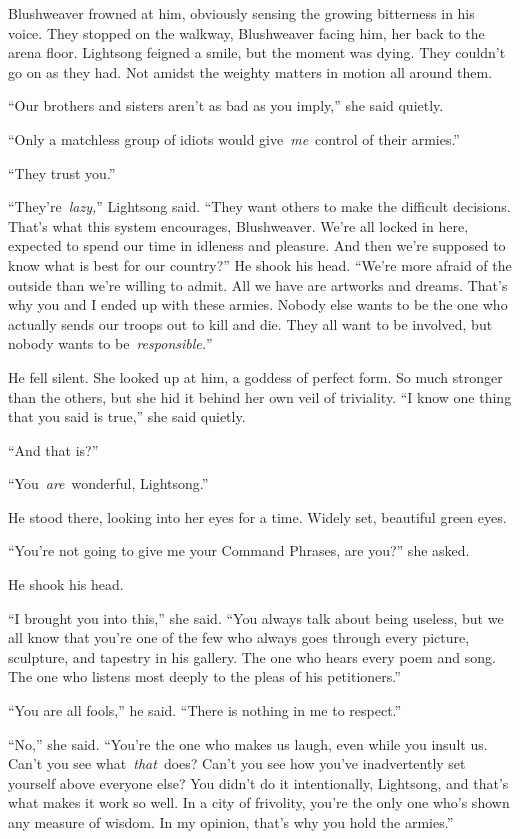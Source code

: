 Blushweaver frowned at him, obviously sensing the growing bitterness in his voice. They stopped on the walkway, Blushweaver facing him, her back to the arena floor. Lightsong feigned a smile, but the moment was dying. They couldn’t go on as they had. Not amidst the weighty matters in motion all around them.

“Our brothers and sisters aren’t as bad as you imply,” she said quietly.

“Only a matchless group of idiots would give~\textit{me}~control of their armies.”

“They trust you.”

“They’re~\textit{lazy,}” Lightsong said. “They want others to make the difficult decisions. That’s what this system encourages, Blushweaver. We’re all locked in here, expected to spend our time in idleness and pleasure. And then we’re supposed to know what is best for our country?” He shook his head. “We’re more afraid of the outside than we’re willing to admit. All we have are artworks and dreams. That’s why you and I ended up with these armies. Nobody else wants to be the one who actually sends our troops out to kill and die. They all want to be involved, but nobody wants to be~\textit{responsible.}”

He fell silent. She looked up at him, a goddess of perfect form. So much stronger than the others, but she hid it behind her own veil of triviality. “I know one thing that you said is true,” she said quietly.

“And that is?”

“You~\textit{are}~wonderful, Lightsong.”

He stood there, looking into her eyes for a time. Widely set, beautiful green eyes.

“You’re not going to give me your Command Phrases, are you?” she asked.

He shook his head.

“I brought you into this,” she said. “You always talk about being useless, but we all know that you’re one of the few who always goes through every picture, sculpture, and tapestry in his gallery. The one who hears every poem and song. The one who listens most deeply to the pleas of his petitioners.”

“You are all fools,” he said. “There is nothing in me to respect.”

“No,” she said. “You’re the one who makes us laugh, even while you insult us. Can’t you see what~\textit{that}~does? Can’t you see how you’ve inadvertently set yourself above everyone else? You didn’t do it intentionally, Lightsong, and that’s what makes it work so well. In a city of frivolity, you’re the only one who’s shown any measure of wisdom. In my opinion, that’s why you hold the armies.”

